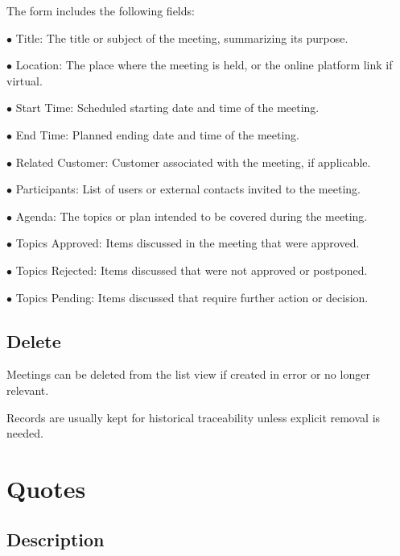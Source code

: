 \documentclass[a4paper]{article}
\begin{document}
The form includes the following fields:

\begin{compactitem}
\item[\color{myblue}$\bullet$] Title: The title or subject of the meeting, summarizing its purpose.
\item[\color{myblue}$\bullet$] Location: The place where the meeting is held, or the online platform link if virtual.
\item[\color{myblue}$\bullet$] Start Time: Scheduled starting date and time of the meeting.
\item[\color{myblue}$\bullet$] End Time: Planned ending date and time of the meeting.
\item[\color{myblue}$\bullet$] Related Customer: Customer associated with the meeting, if applicable.
\item[\color{myblue}$\bullet$] Participants: List of users or external contacts invited to the meeting.
\item[\color{myblue}$\bullet$] Agenda: The topics or plan intended to be covered during the meeting.
\item[\color{myblue}$\bullet$] Topics Approved: Items discussed in the meeting that were approved.
\item[\color{myblue}$\bullet$] Topics Rejected: Items discussed that were not approved or postponed.
\item[\color{myblue}$\bullet$] Topics Pending: Items discussed that require further action or decision.
\end{compactitem}

\hypertarget{toc70}{}
\subsection{Delete}

Meetings can be deleted from the list view if created in error or no longer relevant.

Records are usually kept for historical traceability unless explicit removal is needed.


\hypertarget{toc71}{}
\section{Quotes}

\hypertarget{toc72}{}
\subsection{Description}
\end{document}
